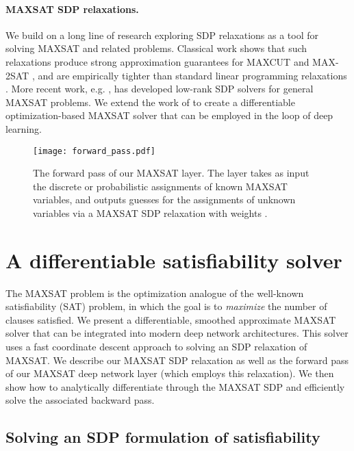 \documentclass{article}
\begin{document}
	\vspace{-5pt}
	\paragraph{MAXSAT SDP relaxations.} We build on a long line of research exploring SDP relaxations as a tool for solving MAXSAT and related problems. 
	Classical work shows that such relaxations produce strong approximation guarantees for MAXCUT and MAX-2SAT \cite{goemans1995improved}, and are empirically tighter than standard linear programming relaxations \cite{gomes2006power}. 
	More recent work, e.g. \citet{wang2017mixing, wang2018low}, has developed low-rank SDP solvers for general MAXSAT problems.
	We extend the work of \citet{wang2017mixing} to create a differentiable optimization-based MAXSAT solver that can be employed in the loop of deep learning.
	
	\begin{figure*}[ht]
		\centering
		\texttt{[image: forward\_pass.pdf]}
		\caption{The forward pass of our MAXSAT layer. The layer takes as input the discrete or probabilistic assignments of known MAXSAT variables, and outputs guesses for the assignments of unknown variables via a MAXSAT SDP relaxation with weights .}
		\label{fig:forward-pass}
	\end{figure*}
	
	\section{A differentiable satisfiability solver}
The MAXSAT problem is the optimization analogue of the well-known satisfiability (SAT) problem, in which the goal is to \emph{maximize} the number of clauses satisfied.
	We present a differentiable, smoothed approximate MAXSAT solver that can be integrated into modern deep network architectures. 
	This solver uses a fast coordinate descent approach to solving an SDP relaxation of MAXSAT.
	We describe our MAXSAT SDP relaxation as well as the forward pass of our MAXSAT deep network layer (which employs this relaxation).
	We then show how to analytically differentiate through the MAXSAT SDP and efficiently solve the associated backward pass.
	
	\subsection{Solving an SDP formulation of satisfiability}
	\label{sec:sdp}
	
\end{document}
